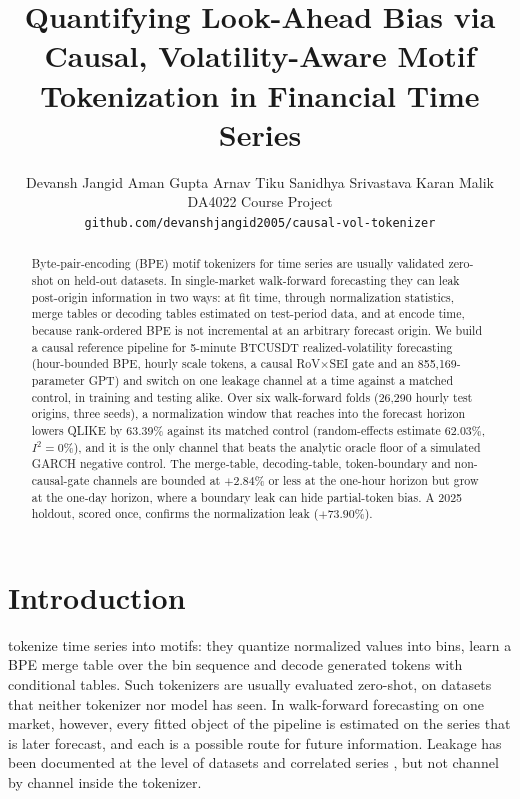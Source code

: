 \documentclass{article}
\title{Quantifying Look-Ahead Bias via Causal, Volatility-Aware Motif Tokenization in Financial Time Series}
\author{%
  Devansh Jangid \quad Aman Gupta \quad Arnav Tiku \quad Sanidhya Srivastava \quad Karan Malik \\
  DA4022 Course Project \\
  \texttt{github.com/devanshjangid2005/causal-vol-tokenizer}
}
\begin{document}
\maketitle

\begin{abstract}
Byte-pair-encoding (BPE) motif tokenizers for time series are usually validated zero-shot on
held-out datasets. In single-market walk-forward forecasting they can leak post-origin information
in two ways: at fit time, through normalization statistics, merge tables or decoding tables
estimated on test-period data, and at encode time, because rank-ordered BPE is not incremental at
an arbitrary forecast origin. We build a causal reference pipeline for 5-minute BTCUSDT
realized-volatility forecasting (hour-bounded BPE, hourly scale tokens, a causal RoV$\times$SEI gate
and an 855,169-parameter GPT) and switch on one leakage channel at a time against a matched control,
in training and testing alike. Over six walk-forward folds (26,290 hourly test origins, three
seeds), a normalization window that reaches into the forecast horizon lowers QLIKE by 63.39\%
against its matched control (random-effects estimate 62.03\%,
$I^2=0\%$), and it is the only channel that beats the analytic oracle floor of a simulated GARCH
negative control. The merge-table, decoding-table, token-boundary and non-causal-gate channels are
bounded at $+2.84\%$ or less at the one-hour horizon but grow at the one-day horizon, where a
boundary leak can hide partial-token bias. A 2025 holdout, scored once, confirms the normalization
leak ($+73.90\%$).
\end{abstract}

\section{Introduction}

\citet{gotz2026bpe} tokenize time series into motifs: they quantize normalized values into bins,
learn a BPE merge table over the bin sequence and decode generated tokens with conditional tables.
Such tokenizers are usually evaluated zero-shot, on datasets that neither tokenizer nor model has
seen. In walk-forward forecasting on one market, however, every fitted object of the pipeline is
estimated on the series that is later forecast, and each is a possible route for future
information. Leakage has been documented at the level of datasets and correlated series
\citep{meyer2025leakage}, but not channel by channel inside the tokenizer.
\end{document}
